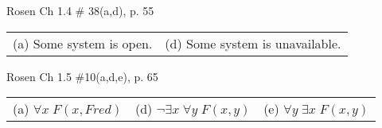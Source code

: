 \documentclass[12pt,addpoints]{exam}
\newcommand{\ra}{\rightarrow}
\begin{document}
\begin{questions}
\question[4] Rosen Ch 1.4 \# 38(a,d), p. 55
    \ifprintanswers
        \vspace{-12pt}
    \fi
\begin{solution}
    \begin{tabular}{ll} 
    	(a) Some system is open. & (d) Some system is unavailable. 
    \end{tabular}
\end{solution}


\question[6] Rosen Ch 1.5 \#10(a,d,e), p. 65
    \ifprintanswers
        \vspace{-12pt}
    \fi
\begin{solution}
	\begin{tabular}{lll} 
		(a) $\forall x\; F(x,Fred)$ & (d) $\neg \exists x\; \forall y\; F(x,y)$ & (e) $ \forall y\; \exists x\; F(x,y)$
	\end{tabular}
\end{solution}



\end{questions}
\end{document}

